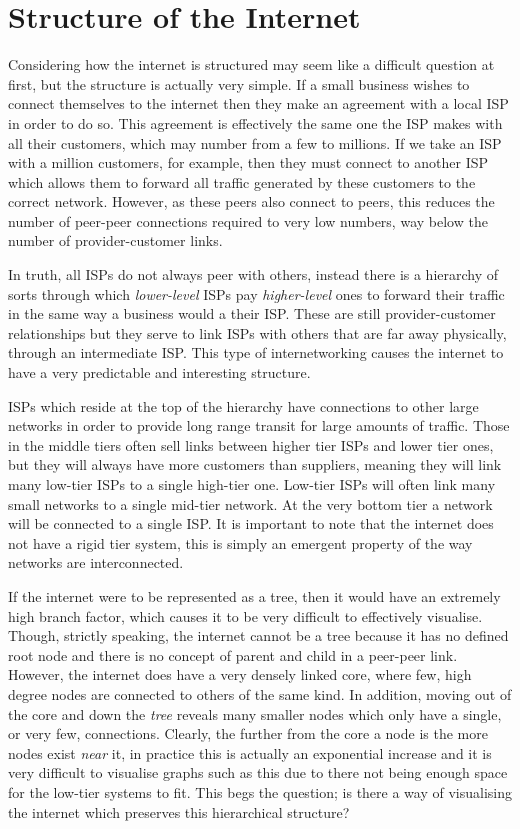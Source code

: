 \section{Structure of the Internet}

Considering how the internet is structured may seem like a difficult question at first, but the structure is actually very simple. If a small business wishes to connect themselves to the internet then they make an agreement with a local ISP in order to do so. This agreement is effectively the same one the ISP makes with all their customers, which may number from a few to millions. If we take an ISP with a million customers, for example, then they must connect to another ISP which allows them to forward all traffic generated by these customers to the correct network. However, as these peers also connect to peers, this reduces the number of peer-peer connections required to very low numbers, way below the number of provider-customer links. 

In truth, all ISPs do not always peer with others, instead there is a hierarchy of sorts through which \textit{lower-level} ISPs pay \textit{higher-level} ones to forward their traffic in the same way a business would a their ISP. These are still provider-customer relationships but they serve to link ISPs with others that are far away physically, through an intermediate ISP. This type of internetworking causes the internet to have a very predictable and interesting structure. 

ISPs which reside at the top of the hierarchy have connections to other large networks in order to provide long range transit for large amounts of traffic. Those in the middle tiers often sell links between higher tier ISPs and lower tier ones, but they will always have more customers than suppliers, meaning they will link many low-tier ISPs to a single high-tier one. Low-tier ISPs will often link many small networks to a single mid-tier network. At the very bottom tier a network will be connected to a single ISP. It is important to note that the internet does not have a rigid tier system, this is simply an emergent property of the way networks are interconnected.

If the internet were to be represented as a tree, then it would have an extremely high branch factor, which causes it to be very difficult to effectively visualise. Though, strictly speaking, the internet cannot be a tree because it has no defined root node and there is no concept of parent and child in a peer-peer link. However, the internet does have a very densely linked core, where few, high degree nodes are connected to others of the same kind. In addition, moving out of the core and down the \textit{tree} reveals many smaller nodes which only have a single, or very few, connections. Clearly, the further from the core a node is the more nodes exist \textit{near} it, in practice this is actually an exponential increase and it is very difficult to visualise graphs such as this due to there not being enough space for the low-tier systems to fit. This begs the question; is there a way of visualising the internet which preserves this hierarchical structure?

